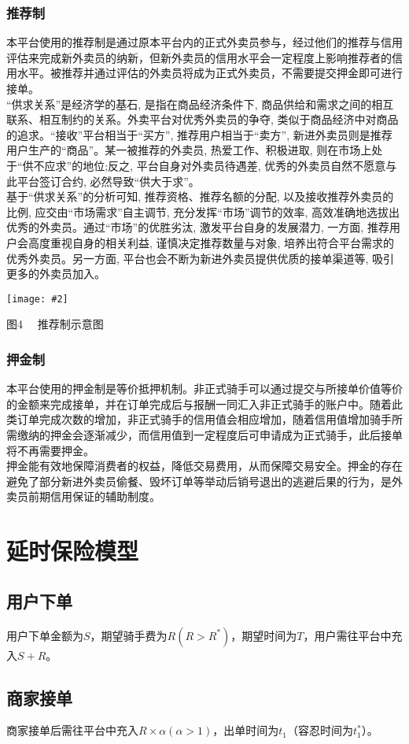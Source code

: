 \documentclass[UTF8]{ctexart}
\newcommand\picturehere[2][1]{\centerline{\texttt{[image: \#2]}}}
\newcommand\picfig[1]{\centerline{\small \heiti #1 \songti }}
\begin{document}
\begin{multicols}{2}
  \subsubsection{推荐制}
  \indent 本平台使用的推荐制是通过原本平台内的正式外卖员参与，经过他们的推荐与信用评估来完成新外卖员的纳新，但新外卖员的信用水平会一定程度上影响推荐者的信用水平。被推荐并通过评估的外卖员将成为正式外卖员，不需要提交押金即可进行接单。\\
  \indent “供求关系”是经济学的基石, 是指在商品经济条件下, 商品供给和需求之间的相互联系、相互制约的关系。外卖平台对优秀外卖员的争夺, 类似于商品经济中对商品的追求。“接收”平台相当于“买方”, 推荐用户相当于“卖方”, 新进外卖员则是推荐用户生产的“商品”。某一被推荐的外卖员, 热爱工作、积极进取, 则在市场上处于“供不应求”的地位;反之, 平台自身对外卖员待遇差, 优秀的外卖员自然不愿意与此平台签订合约, 必然导致“供大于求”。\\
  \indent 基于“供求关系”的分析可知, 推荐资格、推荐名额的分配, 以及接收推荐外卖员的比例, 应交由“市场需求”自主调节, 充分发挥“市场”调节的效率, 高效准确地选拔出优秀的外卖员。通过“市场”的优胜劣汰, 激发平台自身的发展潜力, 一方面, 推荐用户会高度重视自身的相关利益, 谨慎决定推荐数量与对象, 培养出符合平台需求的优秀外卖员。另一方面, 平台也会不断为新进外卖员提供优质的接单渠道等, 吸引更多的外卖员加入。
  \picturehere[0.45]{image/tree.png}
  \picfig{图4  \ \ 推荐制示意图}
  \subsubsection{押金制}
  \indent 本平台使用的押金制是等价抵押机制。非正式骑手可以通过提交与所接单价值等价的金额来完成接单，并在订单完成后与报酬一同汇入非正式骑手的账户中。随着此类订单完成次数的增加，非正式骑手的信用值会相应增加，随着信用值增加骑手所需缴纳的押金会逐渐减少，而信用值到一定程度后可申请成为正式骑手，此后接单将不再需要押金。\\
  \indent 押金能有效地保障消费者的权益，降低交易费用，从而保障交易安全。押金的存在避免了部分新进外卖员偷餐、毁坏订单等举动后销号退出的逃避后果的行为，是外卖员前期信用保证的辅助制度。
  \section{延时保险模型}
  \subsection{用户下单}
  用户下单金额为$S$，期望骑手费为$R(R>R^{*})$，期望时间为$T$，用户需往平台中充入$S+R$。
  \subsection{商家接单}
  商家接单后需往平台中充入$R×\alpha(\alpha>1)$，出单时间为$t_1$（容忍时间为$t_1^{*}$）。

\end{multicols}
\end{document}
